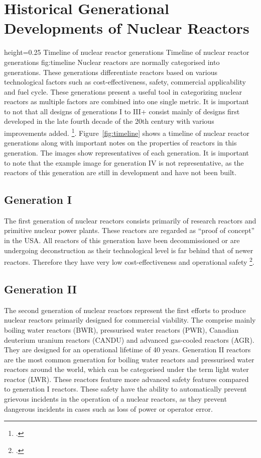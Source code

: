 \chapter{Historical Generational Developments of Nuclear Reactors}
    {height=0.25\textheight}
    {Timeline of nuclear reactor generations}
    {Timeline of nuclear reactor generations}
    {fig:timeline}
Nuclear reactors are normally categorised into generations. These generations differentiate
reactors based on various technological factors such as cost-effectiveness, safety, commercial applicability and
fuel cycle. These generations present a useful tool in categorizing nuclear reactors as multiple factors
are combined into one single metric. It is important to not  that all designs of generations I
to III+ consist mainly of designs first developed in the late fourth decade of the 20th century with
various improvements added. \footcite[1,2]{Gen2gen}.
Figure~\ref{fig:timeline} shows a timeline of nuclear reactor generations along with important notes
on the properties of reactors in this generation. The images show representatives of each generation.
It is important to note that the example image for generation IV is not representative, as the reactors
of this generation are still in development and have not been built.
\section{Generation I}
The first generation of nuclear reactors consists primarily of research reactors and primitive nuclear
power plants. These reactors are regarded as \enquote{proof of concept} in the USA. All reactors of
this generation have been decommissioned or are undergoing deconstruction as their technological level
is far behind that of newer reactors. Therefore they have very low cost-effectiveness and operational
safety \footcite[3]{Gen2gen}.
\section{Generation II}
The second generation of nuclear reactors represent the first efforts to produce nuclear reactors primarily
designed for commercial viability. The comprise mainly boiling water reactors (BWR), pressurised water reactors (PWR),
Canadian deuterium uranium reactors (CANDU) and advanced gas-cooled reactors (AGR).  They are designed
for an operational lifetime of 40 years. Generation II reactors are the most common generation for boiling
water reactors and pressurised water reactors around the world, which can be categorised under the term
light water reactor (LWR). These reactors feature more advanced safety features compared to generation I
reactors. These safety have the ability to automatically prevent grievous incidents in the operation
of a nuclear reactors, as they prevent dangerous incidents in cases such as loss of power or operator
error.

